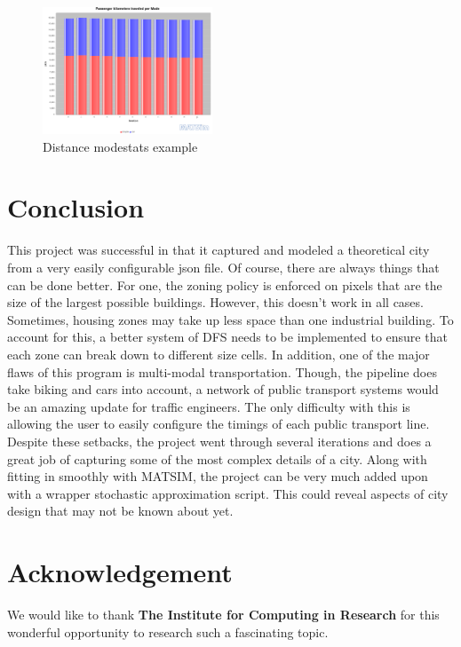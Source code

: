 \documentclass[11pt]{article}
\begin{document}
\begin{multicols}{2}
    \begin{figure}[H]
        \centering
        \includegraphics[width=0.45\textwidth]{images/pkmModestats.png}
        \caption{Distance modestats example}
        \label{fig:pkm-modestats}
    \end{figure}

    \section{Conclusion}

    \quad This project was successful in that it captured and modeled a theoretical city from a very easily configurable json file. Of course, there are always things that can be done better. For one, the zoning policy is enforced on pixels that are the size of the largest possible buildings. However, this doesn't work in all cases. Sometimes, housing zones may take up less space than one industrial building. To account for this, a better system of DFS needs to be implemented to ensure that each zone can break down to different size cells. In addition, one of the major flaws of this program is multi-modal transportation. Though, the pipeline does take biking and cars into account, a network of public transport systems would be an amazing update for traffic engineers. The only difficulty with this is allowing the user to easily configure the timings of each public transport line. Despite these setbacks, the project went through several iterations and does a great job of capturing some of the most complex details of a city. Along with fitting in smoothly with MATSIM, the project can be very much added upon with a wrapper stochastic approximation script. This could reveal aspects of city design that may not be known about yet.

    \section*{Acknowledgement}
    We would like to thank \textbf{The Institute for Computing in Research} for this wonderful opportunity to research such a fascinating topic.
\end{multicols}

\pagebreak



\end{document}
